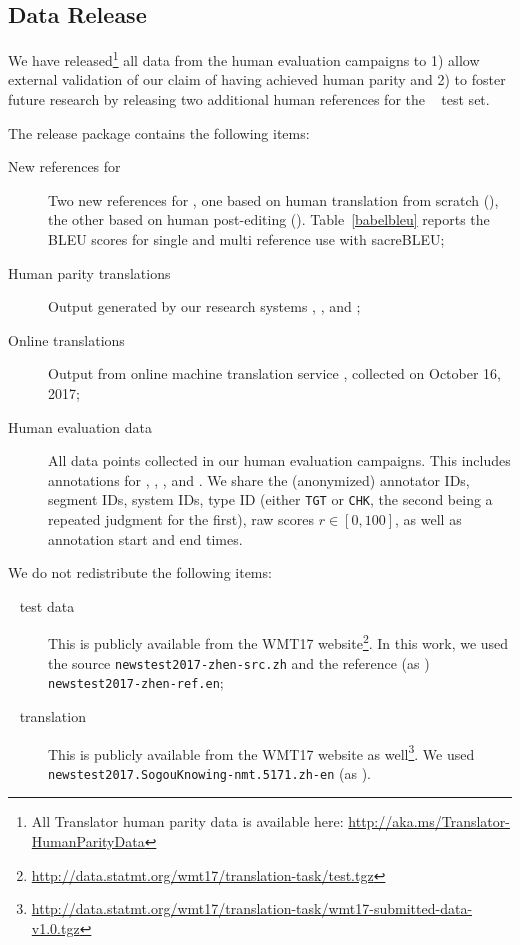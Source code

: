 \documentclass[a4paper]{article}
\begin{document}
\begin{CJK*}{UTF8}{gbsn}
\subsection{Data Release}
\label{datarelease}
We have released\footnote{All Translator human parity data is available here: \url{http://aka.ms/Translator-HumanParityData}} all data from the human evaluation campaigns to 1) allow external validation of our claim of having achieved human parity and 2) to foster future research by releasing two additional human references for the \RefWMT~ test set.

The release package contains the following items:

\begin{description}
\item[New references for \newstest] Two new references for \newstest, one based on human translation from scratch (\RefHT), the other based on human post-editing (\RefPE). Table~\ref{babelbleu} reports the BLEU scores for single and multi reference use with sacreBLEU;

\item[Human parity translations] Output generated by our research systems \ComboA, \ComboB, and \ComboC;

\item[Online translations] Output from online machine translation service \Microsoft, collected on October 16, 2017;

\item[Human evaluation data] All data points collected in our human evaluation campaigns. This includes annotations for \SubsetB, \SubsetC, \SubsetD, and \SubsetE. We share the (anonymized) annotator IDs, segment IDs, system IDs, type ID (either \texttt{TGT} or \texttt{CHK}, the second being a repeated judgment for the first), raw scores $r \in [0, 100]$, as well as annotation start and end times.
\end{description}

We do not redistribute the following items:

\begin{description}
\item[\RefWMT~ test data] This is publicly available from the WMT17 website\footnote{\url{http://data.statmt.org/wmt17/translation-task/test.tgz}}. In this work, we used the source \texttt{newstest2017-zhen-src.zh} and the reference (as \RefWMT) \texttt{newstest2017-zhen-ref.en};

\item[\Sogou~ translation] This is publicly available from the WMT17 website as well\footnote{\url{http://data.statmt.org/wmt17/translation-task/wmt17-submitted-data-v1.0.tgz}}. We used \texttt{newstest2017.SogouKnowing-nmt.5171.zh-en} (as \Sogou).
\end{description}


\end{CJK*}
\end{document}
